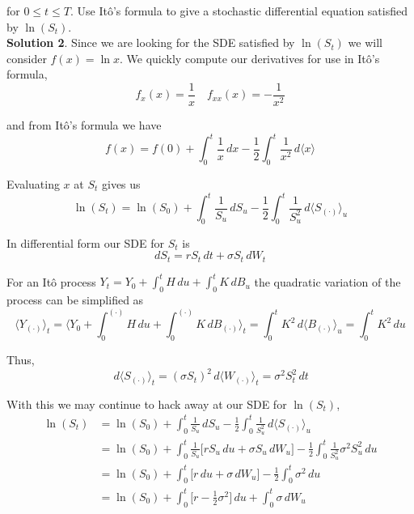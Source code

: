 \documentclass[12pt]{article}
\newlength\tindent
\renewcommand{\indent}{\hspace*{\tindent}}
\begin{document}
for $0 \leq t \leq T$. Use It\^{o}'s formula to give a stochastic differential equation satisfied by $\ln (S_t)$. \\

{\bf Solution 2}. Since we are looking for the SDE satisfied by $\ln(S_t)$ we will consider $f(x) = \ln x$. We quickly compute our derivatives for use in It\^{o}'s formula,
\begin{equation*}
	f_x(x) = \frac{1}{x} \quad f_{xx}(x) = -\frac{1}{x^2}
\end{equation*}

and from It\^{o}'s formula we have
\begin{equation*}
	f(x) = f(0) + \int^t_0 \frac{1}{x} \,dx - \frac{1}{2}\int^t_0 \frac{1}{x^2} \,d\langle x\rangle
\end{equation*}

Evaluating $x$ at $S_t$ gives us
\begin{equation*}
	\ln(S_t) = \ln(S_0) + \int^t_0 \frac{1}{S_u} \,dS_u - \frac{1}{2}\int^t_0 \frac{1}{S_u^2} \,d\langle S_{(\cdot)}\rangle_u
\end{equation*}

In differential form our SDE for $S_t$ is 
\begin{equation*}
	dS_t = rS_t\,dt + \sigma S_t\,dW_t
\end{equation*}

\indent For an It\^{o} process $Y_t = Y_0 + \int^t_0 H \,du + \int^t_0 K \,dB_u$ the quadratic variation of the process can be simplified as
\begin{equation*}
 \langle Y_{(\cdot)} \rangle_t = \Big\langle Y_0 + \int^{(\cdot)}_0 H \,du + \int^{(\cdot)}_0 K \,dB_{(\cdot)} \Big\rangle_t = \int^t_0 K^2\,d\langle B_{(\cdot)}\rangle_u = \int^t_0 K^2 \,du
\end{equation*}

Thus,
\begin{equation*}
	\,d\langle S_{(\cdot)}\rangle_t = (\sigma S_t)^2\,d\langle W_{(\cdot)}\rangle_t = \sigma^2S_t^2\,dt
\end{equation*}

With this we may continue to hack away at our SDE for $\ln(S_t)$,
\begin{align*}
	\ln(S_t) &= \ln(S_0) + \int^t_0 \frac{1}{S_u} \,dS_u - \frac{1}{2}\int^t_0 \frac{1}{S_u^2} \,d\langle S_{(\cdot)}\rangle_u \\
	&= \ln(S_0) + \int^t_0 \frac{1}{S_u} \big[rS_u\,du + \sigma S_u\,dW_u \big] - \frac{1}{2}\int^t_0 \frac{1}{S_u^2} \sigma^2 S_u^2\,du \\
	&= \ln(S_0) + \int^t_0 \big[r\,du + \sigma\,dW_u \big] - \frac{1}{2}\int^t_0 \sigma^2\,du \\
	&= \ln(S_0) + \int^t_0 \big[r - \frac{1}{2}\sigma^2\big] \,du + \int^t_0 \sigma\,dW_u
\end{align*}
\end{document}
